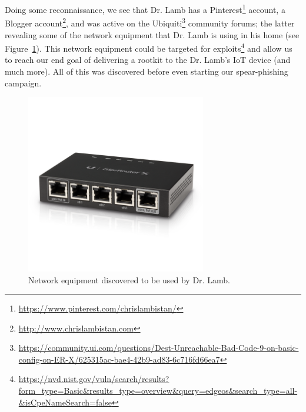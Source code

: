 \documentclass[12pt]{article}
\begin{document}
Doing some reconnaissance, we see that Dr. Lamb has a Pinterest\footnote{\href{http://www.chrislambistan.com}{https://www.pinterest.com/chrislambistan/}} account, a Blogger account\footnote{\href{http://www.chrislambistan.com}{http://www.chrislambistan.com}}, and was active on the Ubiquiti\footnote{\href{https://community.ui.com/questions/Dest-Unreachable-Bad-Code-9-on-basic-config-on-ER-X/625315ac-bae4-42b9-ad83-6c716fd66ea7}{https://community.ui.com/questions/Dest-Unreachable-Bad-Code-9-on-basic-config-on-ER-X/625315ac-bae4-42b9-ad83-6c716fd66ea7}} community forums; the latter revealing some of the network equipment that Dr. Lamb is using in his home (see Figure~\ref{fig:ubiquiti}). This network equipment could be targeted for exploits\footnote{\href{https://nvd.nist.gov/vuln/search/results?form_type=Basic&results_type=overview&query=edgeos&search_type=all&isCpeNameSearch=false}{https://nvd.nist.gov/vuln/search/results?form\_type=Basic\&results\_type=overview\&query=edgeos\&search\_type=all-\&isCpeNameSearch=false}} and allow us to reach our end goal of delivering a rootkit to the Dr. Lamb's IoT device (and much more). All of this was discovered before even starting our spear-phishing campaign.
\vspace{-7em}
\begin{figure}[!ht]
    \centering
    \includegraphics[width=0.7\textwidth]{figure02.png}\vspace{-4em}
    \caption[Network equipment discovered to be used by Dr. Lamb.]{Network equipment discovered to be used by Dr. Lamb.\protect\footnotemark}
    \label{fig:ubiquiti}
\end{figure}

\end{document}
